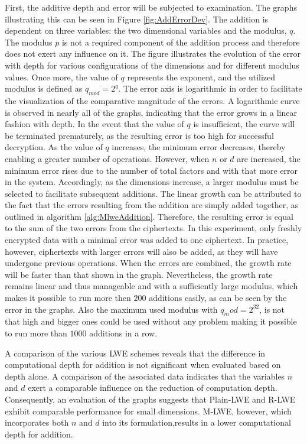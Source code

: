First, the additive depth and error will be subjected to examination. The graphs illustrating this can be seen in Figure \ref{fig:AddErrorDev}. The addition is dependent on three variables: the two dimensional variables and the modulus, $q$. The modulus $p$ is not a required component of the addition process and therefore does not exert any influence on it. The figure illustrates the evolution of the error with depth for various configurations of the dimensions and for different modulus values. Once more, the value of $q$ represents the exponent, and the utilized modulus is defined as $q_{mod} = 2^q$. The error axis is logarithmic in order to facilitate the visualization of the comparative magnitude of the errors. A logarithmic curve is observed in nearly all of the graphs, indicating that the error grows in a linear fashion with depth. In the event that the value of $q$ is insufficient, the curve will be terminated prematurely, as the resulting error is too high for successful decryption. As the value of $q$ increases, the minimum error decreases, thereby enabling a greater number of operations. However, when $n$ or $d$ are increased, the minimum error rises due to the number of total factors and with that more error in the system. Accordingly, as the dimensions increase, a larger modulus must be selected to facilitate subsequent additions. The linear growth can be attributed to the fact that the errors resulting from the addition are simply added together, as outlined in algorithm \ref{alg:MlweAddition}. Therefore, the resulting error is equal to the sum of the two errors from the ciphertexts. In this experiment, only freshly encrypted data with a minimal error was added to one ciphertext. In practice, however, ciphertexts with larger errors will also be added, as they will have undergone previous operations. When the errors are combined, the growth rate will be faster than that shown in the graph. Nevertheless, the growth rate remains linear and thus manageable and with a sufficiently large modulus, which makes it possible to run more then $200$ additions easily, as can be seen by the error in the graphs. Also the maximum used modulus with $q_mod = 2^{32}$, is not that high and bigger ones could be used without any problem making it possible to run more than $1000$ additions in a row.

A comparison of the various LWE schemes reveals that the difference in computational depth for addition is not significant when evaluated based on depth alone. A comparison of the associated data indicates that the variables $n$ and $d$ exert a comparable influence on the reduction of computation depth. Consequently, an evaluation of the graphs suggests that Plain-LWE and R-LWE exhibit comparable performance for small dimensions. M-LWE, however, which incorporates both $n$ and $d$ into its formulation,results in a lower computational depth for addition.

